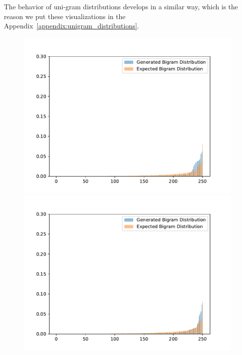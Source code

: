 The behavior of uni-gram distributions develops in a similar way, which is the reason we put these visualizations in the Appendix~\ref{appendix:unigram_distributions}.

\begin{figure}[H]
	\includegraphics[width=\linewidth]{img/plots/reddit/bigram_distribution_comparison_step_500000.pdf}
	\centering
	\small
	\endminipage\hfill
	\includegraphics[width=\linewidth]{img/plots/reddit/bigram_distribution_comparison_step_1000000.pdf}
	\centering
	\small
	\endminipage\hfill

\end{figure}
